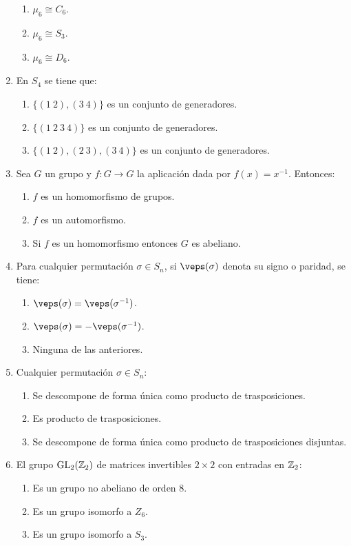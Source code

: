 \documentclass[12pt]{article}
\DeclareMathOperator{\GL}{GL}
\begin{document}
\begin{ejercicio}
\begin{enumerate}
\begin{enumerate}
                \item $\mu_6 \cong C_6$.
                \item $\mu_6 \cong S_3$.
                \item $\mu_6 \cong D_6$.
            \end{enumerate}
            \item En $S_4$ se tiene que:
            \begin{enumerate}
                \item $\{(1\ 2),(3\ 4)\}$ es un conjunto de generadores.
                \item $\{(1\ 2\ 3\ 4)\}$ es un conjunto de generadores.
                \item $\{(1\ 2),(2\ 3),(3\ 4)\}$ es un conjunto de generadores.
            \end{enumerate}
            \item Sea $G$ un grupo y $f : G \to G$ la aplicación dada por $f(x) = x^{-1}$. Entonces:
            \begin{enumerate}
                \item $f$ es un homomorfismo de grupos.
                \item $f$ es un automorfismo.
                \item Si $f$ es un homomorfismo entonces $G$ es abeliano.
            \end{enumerate}
            \item Para cualquier permutación $\sigma \in S_n$, si $\veps(\sigma)$ denota su signo o paridad, se tiene:
            \begin{enumerate}
                \item $\veps(\sigma) = \veps(\sigma^{-1})$.
                \item $\veps(\sigma) = -\veps(\sigma^{-1})$.
                \item Ninguna de las anteriores.
            \end{enumerate}
            \item Cualquier permutación $\sigma \in S_n$:
            \begin{enumerate}
                \item Se descompone de forma única como producto de trasposiciones.
                \item Es producto de trasposiciones.
                \item Se descompone de forma única como producto de trasposiciones disjuntas.
            \end{enumerate}
            \item El grupo $\GL_2(\bb{Z}_2)$ de matrices invertibles $2 \times 2$ con entradas en $\mathbb{Z}_2$:
            \begin{enumerate}
                \item Es un grupo no abeliano de orden 8.
                \item Es un grupo isomorfo a $Z_6$.
                \item Es un grupo isomorfo a $S_3$.
            \end{enumerate}
                

\end{enumerate}
\end{ejercicio}
\end{document}
